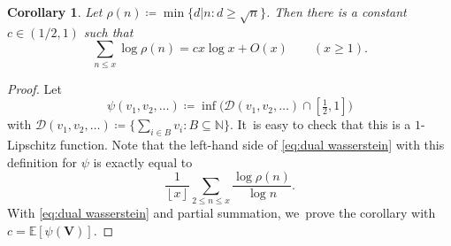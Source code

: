 \documentclass[10pt,a4paper]{article}
\newcommand{\bV}{{\boldsymbol V}}
\newcommand{\EE}{\mathbb{E}}
\newcommand{\floor}[1]{\left\lfloor #1 \right\rfloor}
\theoremstyle{plain}
\newtheorem{cor}{Corollary}[section]
\theoremstyle{definition}
\begin{document}
\begin{cor}
Let $\rho(n) \coloneqq \min\{d|n : d\ge \sqrt n\}$. Then there is a constant $c \in (1/2,1)$ such that
\[
\sum_{n\le x} \log \rho(n) = cx\log x + O(x) \qquad (x \ge 1).
\]
\end{cor}

\begin{proof}
Let
\[
\psi(v_1, v_2, \ldots) \coloneqq \inf \big( \mathcal D(v_1, v_2, \ldots) \cap [\tfrac{1}{2}, 1]\big)
\]
with $\mathcal D(v_1, v_2, \ldots) \coloneqq \{\sum_{i \in B} v_i : B\subseteq \mathbb N\}$. It~is easy to check that this is a $1$-Lipschitz function. Note that the left-hand side of \eqref{eq:dual wasserstein} with this definition for $\psi$ is exactly equal to
\[
\frac{1}{\floor x} \sum_{2 \le n \le x} \frac{\log \rho(n)}{\log n}.
\]
With \eqref{eq:dual wasserstein} and partial summation, we~prove the corollary with $c = \EE[\psi(\bV)]$.
\end{proof}
\end{document}
